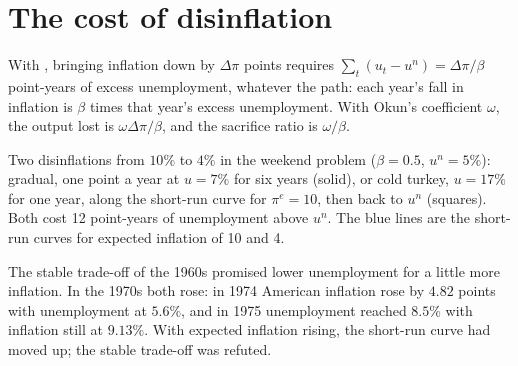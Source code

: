 \section{The cost of disinflation}\label{sec:b1:aggregate-supply:disinflation}

With , bringing inflation down by $\Delta\pi$ points requires
$\sum_t(u_t - u^n) = \Delta\pi/\beta$ point-years of excess unemployment, whatever the path: each
year's fall in inflation is $\beta$ times that year's excess unemployment. With
Okun's coefficient $\omega$, the output lost is $\omega\Delta\pi/\beta$, and the sacrifice ratio is $\omega/\beta$.

\begin{omfigure}

{\small Two disinflations from $10\%$ to $4\%$ in the weekend problem ($\beta = 0.5$,
$u^n = 5\%$): gradual, one point a year at $u = 7\%$ for six years (solid), or cold turkey,
$u = 17\%$ for one year, along the short-run curve for $\pi^e = 10$, then back to $u^n$
(squares). Both cost 12 point-years of unemployment above
$u^n$. The blue lines are the short-run curves for expected inflation of 10 and
4.}
\end{omfigure}

\begin{record}[The 1970s]
The stable trade-off of the 1960s promised lower unemployment for a little
more inflation. In the 1970s both rose: in 1974 American inflation rose by
$4.82$ points with unemployment at $5.6\%$, and in 1975 unemployment reached
$8.5\%$ with inflation still at $9.13\%$. %
With expected inflation rising, the short-run curve had moved up; the
stable trade-off was refuted.
\end{record}


